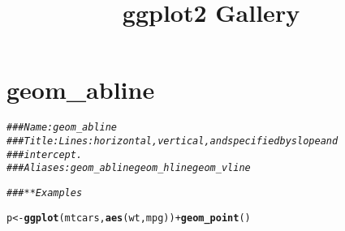 \documentclass[a4paper,titlepage]{tufte-handout}\usepackage[]{graphicx}\usepackage[]{color}
\title{ggplot2 Gallery}
\makeatletter
\newcommand{\hlcom}[1]{\textcolor[rgb]{0.678,0.584,0.686}{\textit{#1}}}%
\newcommand{\hlopt}[1]{\textcolor[rgb]{0,0,0}{#1}}%
\newcommand{\hlstd}[1]{\textcolor[rgb]{0.345,0.345,0.345}{#1}}%
\newcommand{\hlkwb}[1]{\textcolor[rgb]{0.69,0.353,0.396}{#1}}%
\newcommand{\hlkwd}[1]{\textcolor[rgb]{0.737,0.353,0.396}{\textbf{#1}}}%
\newenvironment{kframe}{%
 \def\at@end@of@kframe{}%
 \ifinner\ifhmode%
  \def\at@end@of@kframe{\end{minipage}}%
  \begin{minipage}{\columnwidth}%
 \fi\fi%
 \def\FrameCommand##1{\hskip\@totalleftmargin \hskip-\fboxsep
 \colorbox{shadecolor}{##1}\hskip-\fboxsep
     \hskip-\linewidth \hskip-\@totalleftmargin \hskip\columnwidth}%
 \MakeFramed {\advance\hsize-\width
   \@totalleftmargin\z@ \linewidth\hsize
   \@setminipage}}%
 {\par\unskip\endMakeFramed%
 \at@end@of@kframe}
\newenvironment{knitrout}{}{} %
\makeatother
\begin{document}
\maketitle
\tableofcontents






\section{geom\_abline}

\begin{knitrout}
\color{fgcolor}\begin{kframe}
\begin{alltt}
\hlcom{### Name: geom_abline}
\hlcom{### Title: Lines: horizontal, vertical, and specified by slope and}
\hlcom{###   intercept.}
\hlcom{### Aliases: geom_abline geom_hline geom_vline}

\hlcom{### ** Examples}

\hlstd{p} \hlkwb{<-} \hlkwd{ggplot}\hlstd{(mtcars,} \hlkwd{aes}\hlstd{(wt, mpg))} \hlopt{+} \hlkwd{geom_point}\hlstd{()}


\end{alltt}
\end{kframe}
\end{knitrout}
\end{document}

